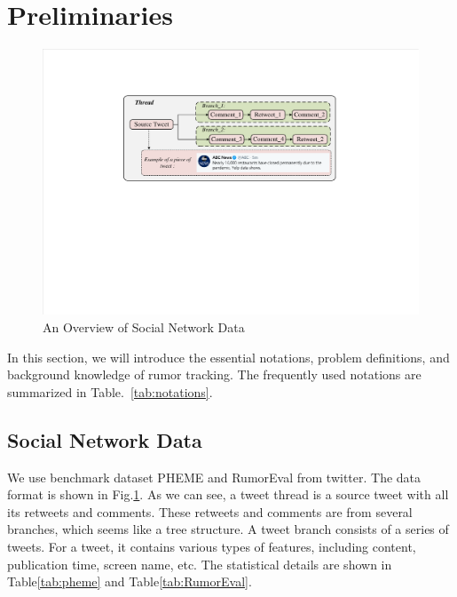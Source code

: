 \section{Preliminaries}
\label{sec:perliminary}

\begin{figure}[tbp]
	\hspace{0ex}
	\vspace{0ex}
	\centering
	\includegraphics[width = \textwidth]{fig/data_format}
	\caption{An Overview of Social Network Data}
	\label{fig:data_format}
\end{figure}

In this section, we will introduce the essential notations, problem definitions, and background knowledge of rumor tracking. The frequently used notations are summarized in Table.~\ref{tab:notations}.

\subsection{Social Network Data}
\label{sec:social_network_data}
We use benchmark dataset PHEME\cite{DBLP:conf/coling/KochkinaLZ18} and RumorEval\cite{DBLP:conf/semeval/EnayetE17} from twitter. The data format is shown in Fig.\ref{fig:data_format}. As we can see, a tweet thread is a source tweet with all its retweets and comments. These retweets and comments are from several branches, which seems like a tree structure. A tweet branch consists of a series of tweets. For a tweet, it contains various types of features, including content, publication time, screen name, etc. The statistical details are shown in Table\ref{tab:pheme} and Table\ref{tab:RumorEval}.


